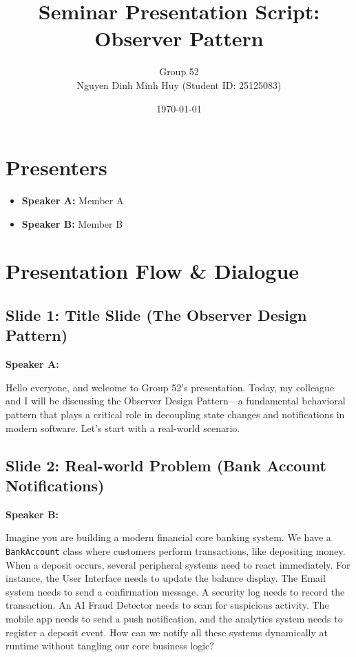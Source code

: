 \documentclass[11pt,a4paper]{article}
\title{Seminar Presentation Script: Observer Pattern}
\author{Group 52 \\ Nguyen Dinh Minh Huy (Student ID: 25125083)}
\date{\today}
\newenvironment{dialogue}[1]{
    \begin{mdframed}[linecolor=gray!40,backgroundcolor=gray!5,roundcorner=5pt,innerleftmargin=10pt,innerrightmargin=10pt,innertopmargin=8pt,innerbottommargin=8pt]
    \textbf{#1:}
}{
    \end{mdframed}
}
\begin{document}
\maketitle

\section{Presenters}
\begin{itemize}
    \item \textbf{Speaker A:} Member A
    \item \textbf{Speaker B:} Member B
\end{itemize}

\section{Presentation Flow \& Dialogue}

\subsection*{Slide 1: Title Slide (The Observer Design Pattern)}
\begin{dialogue}{Speaker A}
    Hello everyone, and welcome to Group 52's presentation. Today, my colleague and I will be discussing the Observer Design Pattern---a fundamental behavioral pattern that plays a critical role in decoupling state changes and notifications in modern software. Let's start with a real-world scenario.
\end{dialogue}

\subsection*{Slide 2: Real-world Problem (Bank Account Notifications)}
\begin{dialogue}{Speaker B}
    Imagine you are building a modern financial core banking system. We have a \texttt{BankAccount} class where customers perform transactions, like depositing money. When a deposit occurs, several peripheral systems need to react immediately. 
    For instance, the User Interface needs to update the balance display. The Email system needs to send a confirmation message. A security log needs to record the transaction. An AI Fraud Detector needs to scan for suspicious activity. The mobile app needs to send a push notification, and the analytics system needs to register a deposit event. How can we notify all these systems dynamically at runtime without tangling our core business logic?
\end{dialogue}
\end{document}
